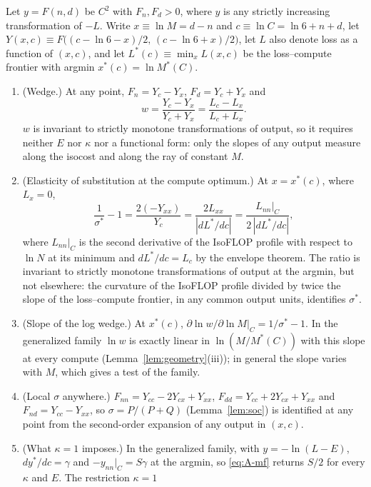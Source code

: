 \begin{proposition}\label{prop:A-modelfree}
Let $y=F(n,d)$ be $C^2$ with $F_n,F_d>0$, where $y$ is any strictly increasing transformation of $-L$. Write
$x\equiv\ln M=d-n$ and $c\equiv\ln C=\ln6+n+d$, let $Y(x,c)\equiv F\big((c-\ln6-x)/2,\,(c-\ln6+x)/2\big)$, let $L$ also
denote loss as a function of $(x,c)$, and let $L^*(c)\equiv\min_xL(x,c)$ be the loss--compute frontier with argmin
$x^*(c)=\ln M^*(C)$.
\begin{enumerate}
\item[(i)] (Wedge.) At any point, $F_n=Y_c-Y_x$, $F_d=Y_c+Y_x$ and
\[
w=\frac{Y_c-Y_x}{Y_c+Y_x}=\frac{L_c-L_x}{L_c+L_x}.
\]
$w$ is invariant to strictly monotone transformations of output, so it requires neither $E$ nor $\kappa$ nor a
functional form: only the slopes of any output measure along the isocost and along the ray of constant $M$.
\item[(ii)] (Elasticity of substitution at the compute optimum.) At $x=x^*(c)$, where $L_x=0$,
\begin{equation}\label{eq:A-mf}
\frac1{\sigma^*}-1=\frac{2(-Y_{xx})}{Y_c}=\frac{2L_{xx}}{|dL^*/dc|}=\frac{L_{nn}|_C}{2\,|dL^*/dc|},
\end{equation}
where $L_{nn}|_C$ is the second derivative of the IsoFLOP profile with respect to $\ln N$ at its minimum and
$dL^*/dc=L_c$ by the envelope theorem. The ratio is invariant to strictly monotone transformations of output at the
argmin, but not elsewhere: the curvature of the IsoFLOP profile divided by twice the slope of the loss--compute frontier,
in any common output units, identifies $\sigma^*$.
\item[(iii)] (Slope of the log wedge.) At $x^*(c)$, $\partial\ln w/\partial\ln M|_C=1/\sigma^*-1$. In the generalized
family $\ln w$ is exactly linear in $\ln(M/M^*(C))$ with this slope at every compute (Lemma~\ref{lem:geometry}(iii)); in
general the slope varies with $M$, which gives a test of the family.
\item[(iv)] (Local $\sigma$ anywhere.) $F_{nn}=Y_{cc}-2Y_{cx}+Y_{xx}$, $F_{dd}=Y_{cc}+2Y_{cx}+Y_{xx}$ and
$F_{nd}=Y_{cc}-Y_{xx}$, so $\sigma=P/(P+Q)$ (Lemma~\ref{lem:soc}) is identified at any point from the second-order expansion
of any output in $(x,c)$.
\item[(v)] (What $\kappa=1$ imposes.) In the generalized family, with $y=-\ln(L-E)$, $dy^*/dc=\gamma$ and
$-y_{nn}|_C=S\gamma$ at the argmin, so \eqref{eq:A-mf} returns $S/2$ for every $\kappa$ and $E$. The restriction $\kappa=1$

\end{enumerate}
\end{proposition}
